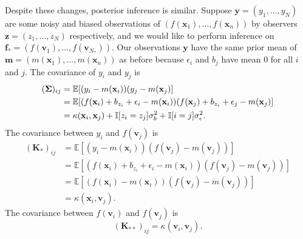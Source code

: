 Despite these changes, posterior inference is similar.
Suppose $\mathbf{y} = (y_1, \dots, y_N)$ are some noisy and biased observations of $(f(\mathbf{x}_1), \dots, f(\mathbf{x}_n))$ by observers $\mathbf{z} = (z_1, \dots, z_N)$ respectively, and we would like to perform inference on $\mathbf{f}_* = (f(\mathbf{v}_1), \dots, f(\mathbf{v}_{N_{*}}))$.
Our observations $\mathbf{y}$ have the same prior mean of $\mathbf{m} = (m(\mathbf{x}_1), \dots, m(\mathbf{x}_n))$ as before because $\epsilon_i$ and $b_j$ have mean 0 for all $i$ and $j$.
The covariance of $y_i$ and $y_{j}$ is
\begin{align*}
    (\boldsymbol{\Sigma})_{ij}
    & = \mathbb{E}[(y_i - m(\mathbf{x}_i))(y_j - m(\mathbf{x}_j)] \\
    & = \mathbb{E}[(f(\mathbf{x}_i) + b_{z_i} + \epsilon_i - m(\mathbf{x}_i))(f(\mathbf{x}_j) + b_{z_i} + \epsilon_j - m(\mathbf{x}_j)] \\
    & = \kappa(\mathbf{x}_i, \mathbf{x}_{j}) + \mathbb{I}[z_i = z_{j}] \sigma^2_b + \mathbb{I}[i = j]\sigma^2_{ \epsilon }.
\end{align*}
The covariance between $y_i$ and $f(\mathbf{v}_j)$ is
\begin{align*}
    (\mathbf{K}_{*})_{ij}
    & = \mathbb{E}[ (y_i - m(\mathbf{x}_i))(f(\mathbf{v}_j) - m(\mathbf{v}_j)) ] \\
    & = \mathbb{E}[ (f(\mathbf{x}_i) + b_{z_i} + \epsilon_i - m(\mathbf{x}_i))(f(\mathbf{v}_j) - m(\mathbf{v}_j))] \\
    & = \mathbb{E}[ (f(\mathbf{x}_i) - m(\mathbf{x}_i))(f(\mathbf{v}_j) - m(\mathbf{v}_j))] \\
    & = \kappa(\mathbf{x}_i, \mathbf{v}_j).
\end{align*}
The covariance between $f(\mathbf{v}_i)$ and $f(\mathbf{v}_j)$ is
\begin{equation*}
    (\mathbf{K}_{* *})_{ij} = \kappa(\mathbf{v}_i, \mathbf{v}_j).
\end{equation*}
